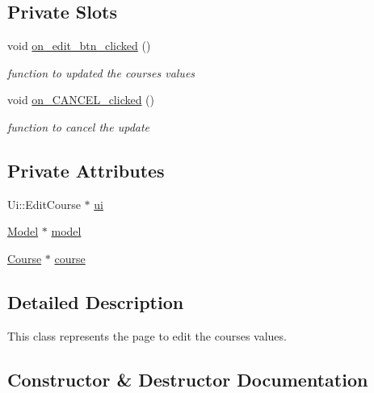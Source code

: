 \subsection*{Private Slots}
\begin{DoxyCompactItemize}
\item 
void \hyperlink{classEditCourse_ae625c52f7558677c52ad62face57d349}{on\+\_\+edit\+\_\+btn\+\_\+clicked} ()
\begin{DoxyCompactList}\small\item\em function to updated the course\textquotesingle{}s values \end{DoxyCompactList}\item 
void \hyperlink{classEditCourse_a8cea0aa3e8f43d6a9aa3260e97e7713e}{on\+\_\+\+C\+A\+N\+C\+E\+L\+\_\+clicked} ()
\begin{DoxyCompactList}\small\item\em function to cancel the update \end{DoxyCompactList}\end{DoxyCompactItemize}
\subsection*{Private Attributes}
\begin{DoxyCompactItemize}
\item 
Ui\+::\+Edit\+Course $\ast$ \hyperlink{classEditCourse_a22a699a4ebce678c8837e9ae4f0aeed2}{ui}
\item 
\hyperlink{classModel}{Model} $\ast$ \hyperlink{classEditCourse_a7dfc909dd668bd50ba3653f7a8d77d34}{model}
\item 
\hyperlink{classCourse}{Course} $\ast$ \hyperlink{classEditCourse_af20120b1d0fe619456bf49b23002c3a1}{course}
\end{DoxyCompactItemize}


\subsection{Detailed Description}
This class represents the page to edit the course\textquotesingle{}s values. 

\subsection{Constructor \& Destructor Documentation}
\mbox{\label{classEditCourse_a9ef9057273412ffc11c923812781a817}} 
